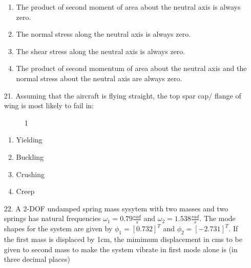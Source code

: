 \documentclass[journal]{IEEEtran}
\begin{document}
\begin{enumerate}
    \begin{enumerate}[label=(\Alph*)]
        \item The product of second moment of area about the neutral axis is always zero.
        \item The normal stress along the neutral axis is always zero.
        \item The shear stress along the neutral axis is always zero.
        \item The product of second momentum of area about the neutral axis and the normal stress about the neutral axis are always zero.
    \end{enumerate}
    \item[21.] Assuming that the aircraft is flying straight, the top spar cap/ flange of wing is most likely to fail in:
    \begin{figure}[!ht]
        \centering
        \caption{1}
    \end{figure}
    \begin{enumerate}[label=(\Alph*)]
        \item  Yielding
        \item  Buckling 
        \item  Crushing
        \item  Creep
    \end{enumerate} 
    
    \item[22.] A 2-DOF undamped spring mass sysytem with two masses and two springs has natural frequencies $\omega_1 = 0.79\frac{rad}{s}$ and $\omega_2 = 1.538\frac{rad}{s}$. The mode shapes for the system are given by $\phi_1 = [0.732]^T$ and $\phi_2 = [-2.731]^T$. If the first mass is displaced by 1cm, the mimimum displacement in cms to be given to second mass to make the system vibrate in first mode alone is  (in three decimal places)
    

\end{enumerate}
\end{document}

